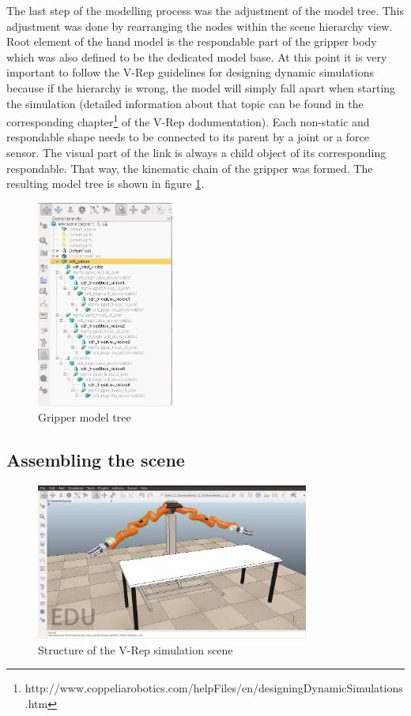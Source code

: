 The last step of the modelling process was the adjustment of the model tree. This adjustment was done by rearranging the nodes within the scene hierarchy view. Root element of the hand model is the respondable part of the gripper body which was also defined to be the dedicated model base. At this point it is very important to follow the V-Rep guidelines for designing dynamic simulations because if the hierarchy is wrong, the model will simply fall apart when starting the simulation (detailed information about that topic can be found in the corresponding chapter\footnote{http://www.coppeliarobotics.com/helpFiles/en/designingDynamicSimulations.htm} of the V-Rep dodumentation). Each non-static and respondable shape needs to be connected to its parent by a joint or a force sensor. The visual part of the link is always a child object of its corresponding respondable. That way, the kinematic chain of the gripper was formed. The resulting model tree is shown in figure \ref{fig:gripper_tree}.
\begin{figure}[ht]
	\centering
  	\includegraphics[width=0.4\textwidth]{images/gripper_tree.jpg}
	\caption{Gripper model tree}
	\label{fig:gripper_tree}
\end{figure}

\subsection{Assembling the scene}

\begin{figure}[hbt]
	\centering
  	\includegraphics[width=0.8\textwidth]{images/simulation_scene.jpg}
	\caption{Structure of the V-Rep simulation scene}
	\label{fig:sim_scene}
\end{figure}

